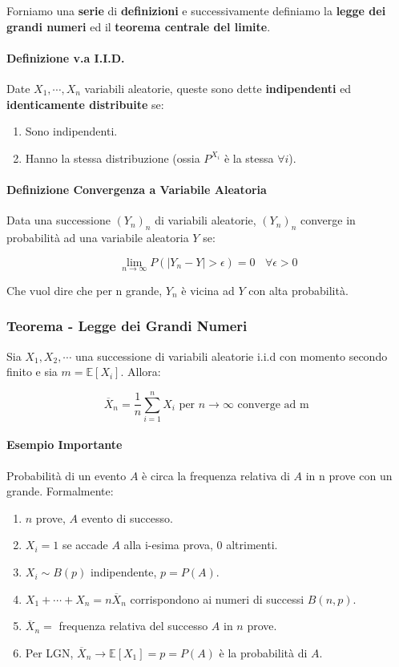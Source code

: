 \documentclass{article}
\begin{document}
Forniamo una \textbf{serie} di \textbf{definizioni} e successivamente definiamo la \textbf{legge dei grandi numeri} ed il \textbf{teorema centrale del limite}.

\paragraph{Definizione v.a I.I.D.} Date $X_{1}, \cdots, X_{n}$ variabili aleatorie, queste sono dette \textbf{indipendenti} ed \textbf{identicamente distribuite} se:

\begin{enumerate}
    \item Sono indipendenti.
    \item Hanno la stessa distribuzione (ossia $P^{X_{i}}$ è la stessa $\forall i$).
\end{enumerate}

\paragraph{Definizione Convergenza a Variabile Aleatoria} Data una successione $(Y_{n})_{n}$ di variabili aleatorie, $(Y_{n})_{n}$ converge in probabilità
ad una variabile aleatoria $Y$ se:

\[ \lim_{n \rightarrow \infty} P(|Y_{n} - Y| > \epsilon ) = 0 \:\:\:\: \forall \epsilon > 0 \]

Che vuol dire che per n grande, $Y_{n}$ è vicina ad $Y$ con alta probabilità.

\subsubsection{Teorema - Legge dei Grandi Numeri}

Sia $X_{1}, X_{2}, \cdots$ una successione di variabili aleatorie i.i.d con momento secondo finito e sia $m = \mathbb{E}[X_{i}]$. Allora:

\[ \overline{X}_{n} = \frac{1}{n} \sum_{i=1}^{n} X_{i} \text{ per } n \rightarrow \infty \text{ converge ad m } \]

\newpage

\paragraph{Esempio Importante} Probabilità di un evento $A$ è circa la frequenza relativa di $A$ in n prove con un grande. Formalmente:

\begin{enumerate}
    \item $n$ prove, $A$ evento di successo.
    \item $X_{i} = 1$ se accade $A$ alla i-esima prova, $0$ altrimenti.
    \item $ X_{i} \sim B(p) $ indipendente, $p = P(A)$.
    \item $ X_{1} + \cdots + X_{n} = n \overline{X}_{n} $ corrispondono ai numeri di successi $B(n,p)$.
    \item $ \overline{X}_{n} = $  frequenza relativa del successo $A$ in $n$ prove. 
    \item Per LGN, $\overline{X}_{n} \rightarrow \mathbb{E}[X_{1}] = p = P(A) $ è la probabilità di $A$.
\end{enumerate}
\end{document}
